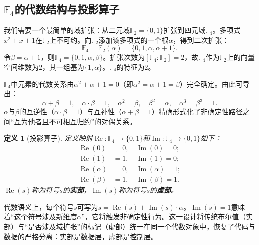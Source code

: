 \documentclass{ctexart}
\newtheorem{definition}[theorem]{定义}
\begin{document}
	\subsection{$\mathbb{F}_4$的代数结构与投影算子}
	
	我们需要一个最简单的域扩张：从二元域$\mathbb{F}_2 = \{0,1\}$扩张到四元域$\mathbb{F}_4$。多项式$x^2 + x + 1$在$\mathbb{F}_2$上不可约。向$\mathbb{F}_2$添加该多项式的一个根$\alpha$，得到二次扩张：
	\[
	\mathbb{F}_4 = \mathbb{F}_2(\alpha) = \{0, 1, \alpha, \alpha+1\}.
	\]
	令$\beta = \alpha + 1$，则$\mathbb{F}_4 = \{0, 1, \alpha, \beta\}$。扩张次数为$[\mathbb{F}_4 : \mathbb{F}_2] = 2$，故$\mathbb{F}_4$作为$\mathbb{F}_2$上的向量空间维数为$2$，其一组基为$\{1, \alpha\}$。$\mathbb{F}_4$的特征为$2$。
	
	$\mathbb{F}_4$中元素的代数关系由$\alpha^2 + \alpha + 1 = 0$（即$\alpha^2 = \alpha + 1 = \beta$）完全确定。由此可导出\cite{lidl1997}：
	\begin{equation}\label{eq:relations}
		\alpha + \beta = 1, \quad \alpha \cdot \beta = 1, \quad \alpha^2 = \beta, \quad \beta^2 = \alpha, \quad \alpha^3 = \beta^3 = 1.
	\end{equation}
	$\alpha$与$\beta$的互逆性（$\alpha \cdot \beta = 1$）与互补性（$\alpha + \beta = 1$）精确形式化了非确定性路径之间``互为他者且不可相互归约''的对偶关系。
	
	\begin{definition}[投影算子]\label{def:projection}
		定义映射$\operatorname{Re}: \mathbb{F}_4 \to \{0,1\}$和$\operatorname{Im}: \mathbb{F}_4 \to \{0,1\}$如下：
		\[
		\begin{aligned}
			\operatorname{Re}(0) &= 0, \quad \operatorname{Im}(0) = 0; \\
			\operatorname{Re}(1) &= 1, \quad \operatorname{Im}(1) = 0; \\
			\operatorname{Re}(\alpha) &= 0, \quad \operatorname{Im}(\alpha) = 1; \\
			\operatorname{Re}(\beta) &= 1, \quad \operatorname{Im}(\beta) = 1.
		\end{aligned}
		\]
		$\operatorname{Re}(s)$称为符号$s$的\textbf{实部}，$\operatorname{Im}(s)$称为符号$s$的\textbf{虚部}。
	\end{definition}
	
	代数语义上，每个符号$s$可写为$s = \operatorname{Re}(s) + \operatorname{Im}(s) \cdot \alpha$。$\operatorname{Im}(s)=1$意味着``这个符号涉及新维度$\alpha$''，它将触发非确定性行为。这一设计将传统布尔值（实部）与``是否涉及域扩张''的标记（虚部）统一在同一个代数对象中，恢复了代码与数据的严格分离：实部是数据层，虚部是控制层。
	
\end{document}
